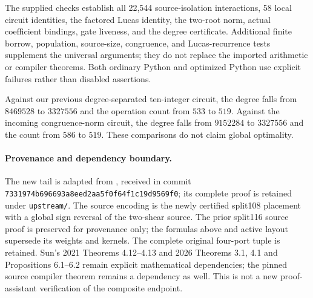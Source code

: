 The supplied checks establish all 22,544 source-isolation interactions, 58 local circuit identities, the factored Lucas identity, the two-root norm, actual coefficient bindings, gate liveness, and the degree certificate. Additional finite borrow, population, source-size, congruence, and Lucas-recurrence tests supplement the universal arguments; they do not replace the imported arithmetic or compiler theorems. Both ordinary Python and optimized Python use explicit failures rather than disabled assertions.

Against our previous degree-separated ten-integer circuit, the degree falls from $8469528$ to $3327556$ and the operation count from $533$ to $519$. Against the incoming congruence-norm circuit, the degree falls from $9152284$ to $3327556$ and the count from $586$ to $519$. These comparisons do not claim global optimality.

\paragraph{Provenance and dependency boundary.}
The new tail is adapted from , received in commit \texttt{7331974b696693a8eed2\allowbreak aa5f0f64f1c19d9569f0}; its complete proof is retained under \texttt{upstream/}. The source encoding is the newly certified split108 placement with a global sign reversal of the two-shear source. The prior split116 source proof is preserved for provenance only; the formulas above and active layout supersede its weights and kernels. The complete original four-port tuple is retained. Sun's 2021 Theorems 4.12--4.13 and 2026 Theorems 3.1, 4.1 and Propositions 6.1--6.2 remain explicit mathematical dependencies; the pinned source compiler theorem remains a dependency as well. This is not a new proof-assistant verification of the composite endpoint.
